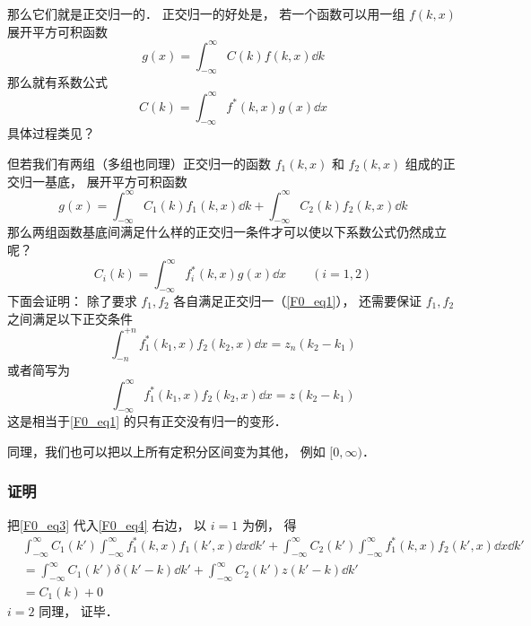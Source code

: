 那么它们就是正交归一的． 正交归一的好处是， 若一个函数可以用一组 $f(k, x)$ 展开平方可积函数
\begin{equation}
g(x) = \int_{-\infty}^{\infty} C(k) f(k, x) \dd{k}
\end{equation}
那么就有系数公式
\begin{equation}
C(k) = \int_{-\infty}^{\infty} f^*(k, x)g(x)\dd{x}
\end{equation}
具体过程类见？

但若我们有两组（多组也同理）正交归一的函数 $f_1(k, x)$ 和 $f_2(k, x)$ 组成的正交归一基底， 展开平方可积函数
\begin{equation}\label{F0_eq3}
g(x) = \int_{-\infty}^{\infty} C_1(k) f_1(k, x) \dd{k} + \int_{-\infty}^{\infty} C_2(k) f_2(k, x) \dd{k}
\end{equation}
那么两组函数基底间满足什么样的正交归一条件才可以使以下系数公式仍然成立呢？
\begin{equation}\label{F0_eq4}
C_i(k) = \int_{-\infty}^{\infty} f_i^*(k, x)g(x)\dd{x} \qquad (i = 1,2)
\end{equation}
下面会证明： 除了要求 $f_1, f_2$ 各自满足正交归一（\autoref{F0_eq1}）， 还需要保证 $f_1, f_2$ 之间满足以下正交条件
\begin{equation}
\int_{-n}^{+n} f_1^*(k_1, x) f_2(k_2, x) \dd{x} = z_n(k_2 - k_1)
\end{equation}
或者简写为
\begin{equation}
\int_{-\infty}^{\infty} f_1^*(k_1, x) f_2(k_2, x) \dd{x} = z(k_2 - k_1)
\end{equation}
这是相当于\autoref{F0_eq1} 的只有正交没有归一的变形．

同理，我们也可以把以上所有定积分区间变为其他， 例如 $[0, \infty)$．

\subsubsection{证明}
把\autoref{F0_eq3} 代入\autoref{F0_eq4} 右边， 以 $i = 1$ 为例， 得
\begin{equation}
\begin{aligned}
&\int_{-\infty}^{\infty} C_1(k') \int_{-\infty}^{\infty} f_1^*(k, x) f_1(k', x)\dd{x} \dd{k'} + \int_{-\infty}^{\infty} C_2(k') \int_{-\infty}^{\infty} f_1^*(k, x)f_2(k', x)\dd{x} \dd{k'}\\
&= \int_{-\infty}^{\infty} C_1(k') \delta(k' - k) \dd{k'} + \int_{-\infty}^{\infty} C_2(k') z(k' - k) \dd{k'}\\
&= C_1(k) + 0
\end{aligned}
\end{equation}
$i = 2$ 同理， 证毕．

